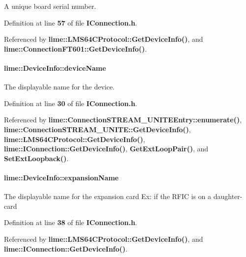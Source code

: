 A unique board serial number. 



Definition at line {\bf 57} of file {\bf I\+Connection.\+h}.



Referenced by {\bf lime\+::\+L\+M\+S64\+C\+Protocol\+::\+Get\+Device\+Info()}, and {\bf lime\+::\+Connection\+F\+T601\+::\+Get\+Device\+Info()}.

\paragraph[{device\+Name}]{ lime\+::\+Device\+Info\+::device\+Name}\label{structlime_1_1DeviceInfo_adc3e86d3b4719bd5c9b973107d523d19}


The displayable name for the device. 



Definition at line {\bf 30} of file {\bf I\+Connection.\+h}.



Referenced by {\bf lime\+::\+Connection\+S\+T\+R\+E\+A\+M\+\_\+\+U\+N\+I\+T\+E\+Entry\+::enumerate()}, {\bf lime\+::\+Connection\+S\+T\+R\+E\+A\+M\+\_\+\+U\+N\+I\+T\+E\+::\+Get\+Device\+Info()}, {\bf lime\+::\+L\+M\+S64\+C\+Protocol\+::\+Get\+Device\+Info()}, {\bf lime\+::\+I\+Connection\+::\+Get\+Device\+Info()}, {\bf Get\+Ext\+Loop\+Pair()}, and {\bf Set\+Ext\+Loopback()}.

\paragraph[{expansion\+Name}]{ lime\+::\+Device\+Info\+::expansion\+Name}\label{structlime_1_1DeviceInfo_a22f16be6025292a0e024bbd9773d7bf5}
The displayable name for the expansion card Ex\+: if the R\+F\+IC is on a daughter-\/card 

Definition at line {\bf 38} of file {\bf I\+Connection.\+h}.



Referenced by {\bf lime\+::\+L\+M\+S64\+C\+Protocol\+::\+Get\+Device\+Info()}, and {\bf lime\+::\+I\+Connection\+::\+Get\+Device\+Info()}.


